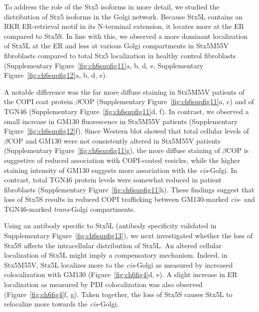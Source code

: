 To address the role of the Stx5 isoforms in more detail, we studied the distribution of Stx5 isoforms in the Golgi network. Because Stx5L contains an RKR ER-retrieval motif in its N-terminal extension, it locates more at the ER compared to Stx5S\cite{linders_stx5-mediated_2019,hui_isoform_1997,dominguez_gp25l/emp24/p24_1998,miyazaki_contribution_2012}. In line with this, we observed a more dominant localization of Stx5L at the ER and less at various Golgi compartments in Stx5M55V fibroblasts compared to total Stx5 localization in healthy control fibroblasts (Supplementary Figure~\ref{fig:ch6supfig11}a, b, d, e, Supplementary Figure~\ref{fig:ch6supfig12}a, b, d, e). 

A notable difference was the far more diffuse staining in Stx5M55V patients of the COPI coat protein $\beta$COP (Supplementary Figure~\ref{fig:ch6supfig11}a, c) and of TGN46 (Supplementary Figure~\ref{fig:ch6supfig11}d, f). In contrast, we observed a small increase in GM130 fluorescence in Stx5M55V patients (Supplementary Figure~\ref{fig:ch6supfig12}f). Since Western blot showed that total cellular levels of $\beta$COP and GM130 were not consistently altered in Stx5M55V patients (Supplementary Figure~\ref{fig:ch6supfig11}g), the more diffuse staining of $\beta$COP is suggestive of reduced association with COPI-coated vesicles, while the higher staining intensity of GM130 suggests more association with the \emph{cis}-Golgi. In contrast, total TGN46 protein levels were somewhat reduced in patient fibroblasts (Supplementary Figure~\ref{fig:ch6supfig11}h). These findings suggest that loss of Stx5S results in reduced COPI trafficking between GM130-marked \emph{cis}- and TGN46-marked \emph{trans}-Golgi compartments. 

Using an antibody specific to Stx5L (antibody specificity validated in Supplementary Figure~\ref{fig:ch6supfig13}), we next investigated whether the loss of Stx5S affects the intracellular distribution of Stx5L. An altered cellular localization of Stx5L might imply a compensatory mechanism. Indeed, in Stx5M55V, Stx5L localizes more to the \emph{cis}-Golgi as measured by increased colocalization with GM130 (Figure~\ref{fig:ch6fig4}d, e). A slight increase in ER localization as measured by PDI colocalization was also observed (Figure~\ref{fig:ch6fig4}f, g). Taken together, the loss of Stx5S causes Stx5L to relocalize more towards the \emph{cis}-Golgi.

